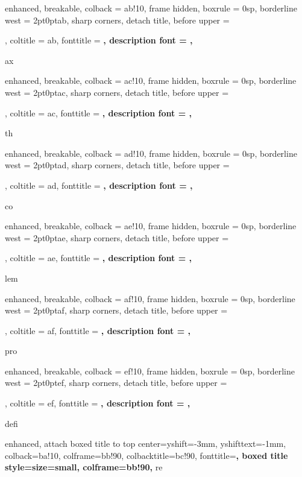 {
	enhanced, breakable, colback = ab!10,
	frame hidden, boxrule = 0sp,
	borderline west = {2pt}{0pt}{ab},
	sharp corners, detach title,
	before upper = \tcbtitle\par, coltitle = ab,
	fonttitle = \bfseries\sffamily, description font = \mdseries,
}
{ax}

{
	enhanced, breakable, colback = ac!10,
	frame hidden, boxrule = 0sp,
	borderline west = {2pt}{0pt}{ac},
	sharp corners, detach title,
	before upper = \tcbtitle\par, coltitle = ac,
	fonttitle = \bfseries\sffamily, description font = \mdseries,
}
{th}

{
	enhanced, breakable, colback = ad!10,
	frame hidden, boxrule = 0sp,
	borderline west = {2pt}{0pt}{ad},
	sharp corners, detach title,
	before upper = \tcbtitle\par, coltitle = ad,
	fonttitle = \bfseries\sffamily, description font = \mdseries,
}
{co}

{
	enhanced, breakable, colback = ae!10,
	frame hidden, boxrule = 0sp,
	borderline west = {2pt}{0pt}{ae},
	sharp corners, detach title,
	before upper = \tcbtitle\par, coltitle = ae,
	fonttitle = \bfseries\sffamily, description font = \mdseries,
}
{lem}

{
	enhanced, breakable, colback = af!10,
	frame hidden, boxrule = 0sp,
	borderline west = {2pt}{0pt}{af},
	sharp corners, detach title,
	before upper = \tcbtitle\par, coltitle = af,
	fonttitle = \bfseries\sffamily, description font = \mdseries,
}
{pro}

{
	enhanced, breakable, colback = ef!10,
	frame hidden, boxrule = 0sp,
	borderline west = {2pt}{0pt}{ef},
	sharp corners, detach title,
	before upper = \tcbtitle\par, coltitle = ef,
	fonttitle = \bfseries\sffamily, description font = \mdseries,
}
{defi}

{
	enhanced, attach boxed title to top center={yshift=-3mm, yshifttext=-1mm},
	colback=ba!10, colframe=bb!90, colbacktitle=bc!90,
	fonttitle=\bfseries, boxed title style={size=small, colframe=bb!90},
}
{re}

